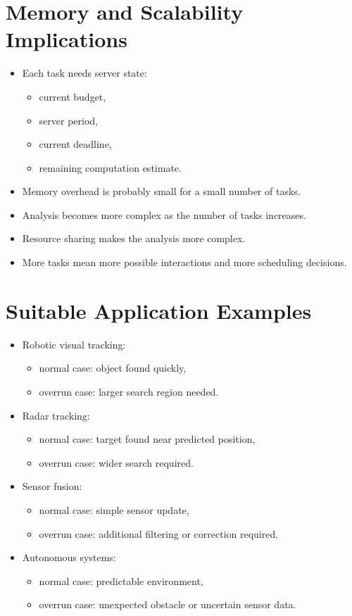 \documentclass[a4paper,11pt]{article}
\begin{document}
\section*{Memory and Scalability Implications}

\begin{itemize}
    \item Each task needs server state:
    \begin{itemize}
        \item current budget,
        \item server period,
        \item current deadline,
        \item remaining computation estimate.
    \end{itemize}
    \item Memory overhead is probably small for a small number of tasks.
    \item Analysis becomes more complex as the number of tasks increases.
    \item Resource sharing makes the analysis more complex.
    \item More tasks mean more possible interactions and more scheduling decisions.
\end{itemize}

\section*{Suitable Application Examples}

\begin{itemize}
    \item Robotic visual tracking:
    \begin{itemize}
        \item normal case: object found quickly,
        \item overrun case: larger search region needed.
    \end{itemize}
    \item Radar tracking:
    \begin{itemize}
        \item normal case: target found near predicted position,
        \item overrun case: wider search required.
    \end{itemize}
    \item Sensor fusion:
    \begin{itemize}
        \item normal case: simple sensor update,
        \item overrun case: additional filtering or correction required.
    \end{itemize}
    \item Autonomous systems:
    \begin{itemize}
        \item normal case: predictable environment,
        \item overrun case: unexpected obstacle or uncertain sensor data.
    \end{itemize}
\end{itemize}
\end{document}
